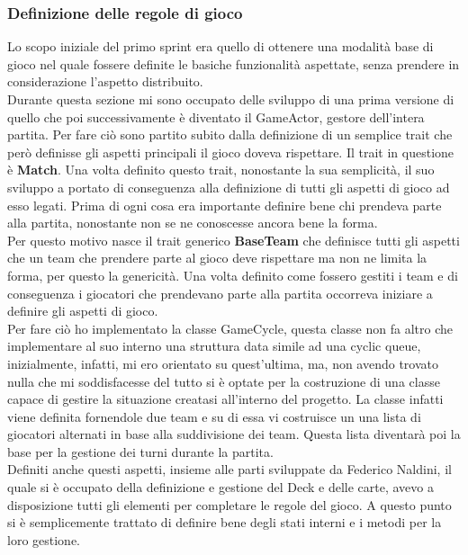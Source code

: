 	\subsubsection{Definizione delle regole di gioco}
	  Lo scopo iniziale del primo sprint era quello di ottenere una modalità base di gioco nel quale fossere definite le basiche funzionalità aspettate, senza prendere in considerazione l'aspetto distribuito.
	  \\
	  Durante questa sezione mi sono occupato delle sviluppo di una prima versione di quello che poi successivamente è diventato il GameActor, gestore dell'intera partita. 
	  Per fare ciò sono partito subito dalla definizione di un semplice trait che però definisse gli aspetti principali il gioco doveva rispettare. 
	  Il trait in questione è \textbf{Match}. Una volta definito questo trait, nonostante la sua semplicità, il suo sviluppo a portato di conseguenza alla definizione di tutti gli aspetti di gioco ad esso legati. 
	  Prima di ogni cosa era importante definire bene chi prendeva parte alla partita, nonostante non se ne conoscesse ancora bene la forma. \\
	  Per questo motivo nasce il trait generico \textbf{BaseTeam} che definisce tutti gli aspetti che un team che prendere parte al gioco deve rispettare ma non ne limita la forma, per questo la genericità.
	  Una volta definito come fossero gestiti i team e di conseguenza i giocatori che prendevano parte alla partita occorreva iniziare a definire gli aspetti di gioco.\\
	  Per fare ciò ho implementato la classe GameCycle, questa classe non fa altro che implementare al suo interno una struttura data simile ad una cyclic queue, inizialmente, infatti, mi ero orientato su quest'ultima, ma, non avendo trovato nulla che mi soddisfacesse del tutto si è optate per la costruzione di una classe capace di gestire la situazione creatasi all'interno del progetto. 
	  La classe infatti viene definita fornendole due team e su di essa vi costruisce un una lista di giocatori alternati in base alla suddivisione dei team. Questa lista diventarà poi la base per la gestione dei turni durante la partita. 
	  \\
	  Definiti anche questi aspetti, insieme alle parti sviluppate da Federico Naldini, il quale si è occupato della definizione e gestione del Deck e delle carte, avevo a disposizione tutti gli elementi per completare le regole del gioco. 
	  A questo punto si è semplicemente trattato di definire bene degli stati interni e i metodi per la loro gestione. 
	  \\

